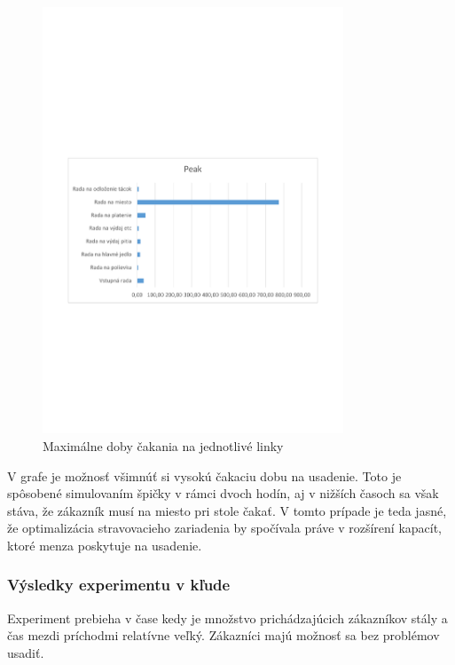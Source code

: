 \documentclass{article}
\begin{document}
\begin{figure}[h!]
  \centering
  \includegraphics[width=0.8\textwidth,keepaspectratio]{experiment_2.pdf}
  \caption{Maximálne doby čakania na jednotlivé linky}
  \label{fig:experiment_2}
\end{figure}

V grafe je možnosť všimnúť si vysokú čakaciu dobu na usadenie. Toto je spôsobené simulovaním špičky v rámci dvoch hodín, aj v nižších časoch sa však stáva, že zákazník musí na miesto pri stole čakať. V tomto prípade je teda jasné, že optimalizácia stravovacieho zariadenia by spočívala práve v rozšírení kapacít, ktoré menza poskytuje na usadenie.

\pagebreak
\subsubsection{Výsledky experimentu v kľude}
Experiment prebieha v čase kedy je množstvo prichádzajúcich zákazníkov stály a čas mezdi príchodmi relatívne veľký. Zákazníci majú možnosť sa bez problémov usadiť.
\end{document}

